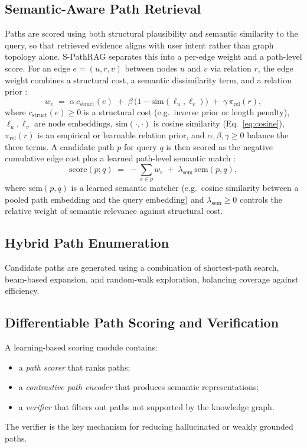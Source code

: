 \documentclass[12pt,a4paper,oneside]{report}
\begin{document}
\subsection{Semantic-Aware Path Retrieval}
Paths are scored using both structural plausibility and semantic similarity
to the query, so that retrieved evidence aligns with user intent rather than
graph topology alone. S-PathRAG separates this into a per-edge weight
and a path-level score. For an edge $e = (u, r, v)$ between nodes $u$
and $v$ via relation $r$, the edge weight combines a structural cost,
a semantic dissimilarity term, and a relation prior
\citep{fu2026spathrag}:
\begin{equation}
    w_e \;=\; \alpha \, c_{\mathrm{struct}}(e)
           \;+\; \beta \, \bigl(1 - \mathrm{sim}(\ell_u, \ell_v)\bigr)
           \;+\; \gamma \, \pi_{\mathrm{rel}}(r),
    \label{eq:spathrag_edge}
\end{equation}
where $c_{\mathrm{struct}}(e) \ge 0$ is a structural cost (e.g.\ inverse
prior or length penalty), $\ell_u, \ell_v$ are node embeddings,
$\mathrm{sim}(\cdot,\cdot)$ is cosine similarity (Eq.~\eqref{eq:cosine}),
$\pi_{\mathrm{rel}}(r)$ is an empirical or learnable relation prior, and
$\alpha, \beta, \gamma \ge 0$ balance the three terms. A candidate path
$p$ for query $q$ is then scored as the negative cumulative edge cost
plus a learned path-level semantic match
\citep{fu2026spathrag}:
\begin{equation}
    \mathrm{score}(p; q) \;=\; -\!\sum_{e \in p} w_e \;+\; \lambda_{\mathrm{sem}} \, \mathrm{sem}(p, q),
    \label{eq:spathrag_score}
\end{equation}
where $\mathrm{sem}(p, q)$ is a learned semantic matcher (e.g.\ cosine
similarity between a pooled path embedding and the query embedding) and
$\lambda_{\mathrm{sem}} \ge 0$ controls the relative weight of semantic
relevance against structural cost.

\subsection{Hybrid Path Enumeration}
Candidate paths are generated using a combination of shortest-path search,
beam-based expansion, and random-walk exploration, balancing coverage
against efficiency.

\subsection{Differentiable Path Scoring and Verification}
A learning-based scoring module contains:
\begin{itemize}[leftmargin=2em,itemsep=2pt]
    \item a \emph{path scorer} that ranks paths;
    \item a \emph{contrastive path encoder} that produces semantic
          representations;
    \item a \emph{verifier} that filters out paths not supported by the
          knowledge graph.
\end{itemize}
The verifier is the key mechanism for reducing hallucinated or weakly
grounded paths.
\end{document}
